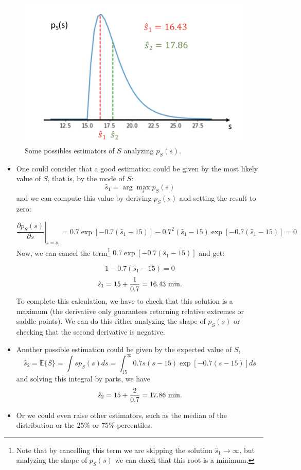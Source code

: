 \begin{solution}
\begin{itemize}
\begin{figure}[!t]
\begin{centering}
\includegraphics[scale=.25]{Figures/Fig_MC1_2.png}
\caption{Some possibles estimators of $S$ analyzing $p_S(s)$.}
\label{Fig_ps_s1_s2}
\end{centering}
\end{figure}

\begin{itemize}
\item One could consider that a good estimation could be given by the most likely value of $S$, that is, by the mode of $S$:
$$ \hat{s}_1  = {\arg\max_s}  p_S(s) $$
and we can compute this value by deriving $p_S(s)$ and setting the result to zero:

$$  \left.\frac{\partial p_S(s)}{\partial s} \right|_{s = \hat{s}_1} = 0.7 \exp{\left[-0.7 \left(\hat{s}_1 -15\right) \right]} - 0.7^2 \left(\hat{s}_1 -15\right) \exp{\left[-0.7 \left(\hat{s}_1 -15\right)  \right]} =0$$
Now, we can cancel the term\footnote{Note that by cancelling this term we are skipping the solution $\hat{s}_1 \rightarrow \infty$, but analyzing the shape of $p_S(s)$ we can check that this root is a minimum.} $0.7\exp{\left[-0.7 \left(\hat{s}_1 -15\right) \right]}$ and get:

$$ 1 - 0.7( \hat{s}_1 -15) =0$$
$$ \hat{s}_1  = 15 + \displaystyle \frac{1}{0.7}= 16.43~ {\rm min.}$$
To complete this calculation, we have to check that this solution is a maximum (the derivative only guarantees returning relative extremes or saddle points). We can do this either analyzing the shape of $p_S(s)$ or checking that the second derivative is negative.
\item Another possible estimation could be given by the expected value of $S$,
$$  \hat{s}_2 = \mathbb{E}\{S\} = \int s p_S(s) ds =  \int_{15}^{\infty} 0.7 s \left(s -15\right) \exp{\left[-0.7 \left(s-15\right)  \right]} ds $$
and solving this integral by parts, we have
$$ \hat{s}_2 =   15 + \displaystyle \frac{2}{0.7}=17.86~{\rm min.}$$
\item Or we could even raise other estimators, such as the median of the distribution or the 25\% or 75\% percentiles. 
\end{itemize}


\end{itemize}
\end{solution}
